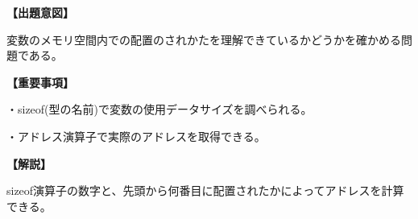 \noindent \textbf{【出題意図】}

\noindent 変数のメモリ空間内での配置のされかたを理解できているかどうかを確かめる問題である。

\vspace{1em}
\noindent \textbf{【重要事項】}

\medskip
\noindent ・sizeof(型の名前)で変数の使用データサイズを調べられる。

\medskip
\noindent ・アドレス演算子で実際のアドレスを取得できる。

\vspace{1em}
\noindent \textbf{【解説】}

\noindent sizeof演算子の数字と、先頭から何番目に配置されたかによってアドレスを計算できる。
